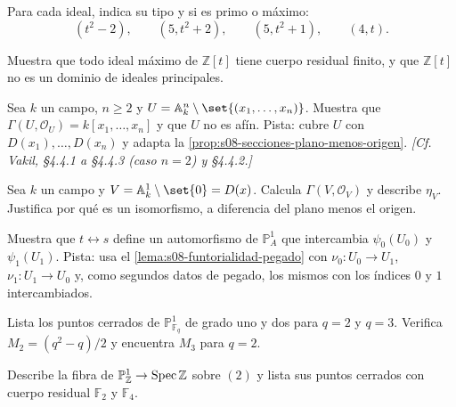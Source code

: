 \begin{ejer}
\label{ejer:s08-clasificar-ideales-z-t}
Para cada ideal, indica su tipo y si es primo o máximo:
\[
(t^2-2),\qquad (5,t^2+2),\qquad (5,t^2+1),\qquad (4,t).
\]
\end{ejer}

\begin{ejer}
\label{ejer:s08-maximos-z-t}
Muestra que todo ideal máximo de $\mathbb Z[t]$ tiene cuerpo residual finito, y que $\mathbb Z[t]$ no es un dominio de ideales principales.
\end{ejer}

\begin{ejer}
\label{ejer:s08-afin-menos-origen}
Sea $k$ un campo, $n\geq2$ y $U=\mathbb A_k^n\setminus\set{(x_1,\ldots,x_n)}$. Muestra que $\Gamma(U,\mathcal O_U)=k[x_1,\ldots,x_n]$ y que $U$ no es afín. Pista: cubre $U$ con $D(x_1),\ldots,D(x_n)$ y adapta la \cref{prop:s08-secciones-plano-menos-origen}. \emph{[Cf. Vakil, \S4.4.1 a \S4.4.3 (caso $n=2$) y \S4.4.2.]}
\end{ejer}

\begin{ejer}
\label{ejer:s08-recta-menos-origen}
Sea $k$ un campo y $V=\mathbb A_k^1\setminus\set{0}=D(x)$. Calcula $\Gamma(V,\mathcal O_V)$ y describe $\eta_V$. Justifica por qué es un isomorfismo, a diferencia del plano menos el origen.
\end{ejer}

\begin{ejer}
\label{ejer:s08-intercambio-cartas}
Muestra que $t\leftrightarrow s$ define un automorfismo de $\mathbb P_A^1$ que intercambia $\psi_0(U_0)$ y $\psi_1(U_1)$. Pista: usa el \cref{lema:s08-funtorialidad-pegado} con $\nu_0\colon U_0\to U_1$, $\nu_1\colon U_1\to U_0$ y, como segundos datos de pegado, los mismos con los índices $0$ y $1$ intercambiados.
\end{ejer}

\begin{ejer}
\label{ejer:s08-puntos-f2-f3}
Lista los puntos cerrados de $\mathbb P_{\mathbb F_q}^1$ de grado uno y dos para $q=2$ y $q=3$. Verifica $M_2=(q^2-q)/2$ y encuentra $M_3$ para $q=2$.
\end{ejer}

\begin{ejer}
\label{ejer:s08-puntos-sobre-dos}
Describe la fibra de $\mathbb P_{\mathbb Z}^1\to\operatorname{Spec}\mathbb Z$ sobre $(2)$ y lista sus puntos cerrados con cuerpo residual $\mathbb F_2$ y $\mathbb F_4$.
\end{ejer}

